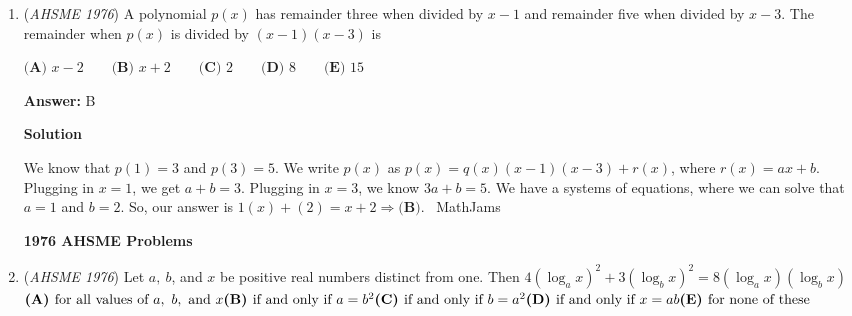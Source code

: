 \begin{enumerate}
 \textbf{Answer: }E



\textbf{Solution 1}

Extend $\overline{BD}$ until it touches the opposite side of the circle, say at point $E.$ By power of a point, we have $AB^2=(BC)(BE),$ so $BE=\frac{6^2}{3}=12.$ Therefore, $DE=12-3-3=6.$ 

 Now extend $\overline{OD}$ in both directions so that it intersects the circle in two points (in other words, draw the diameter of the circle that contains $OD$). Let the two endpoints of this diameter be $P$ and $Q,$ where $Q$ is closer to $C.$ Again use power of a point. We have $(PD)(DQ)=(CD)(DE)=3 \cdot 6=18.$ But if the radius of the circle is $r,$ we see that $PD=r+2$ and $DQ=r-2,$ so we have the equation $(r+2)(r-2)=18.$ Solving gives $r=\sqrt{22}.$

 ==Solution 2== (Law of Cosines Bash)

 Note we can make multiple triangles, and just eliminate the angle for an LOC Bash.

 


	\item (\textit{AHSME 1976}) A polynomial $p(x)$ has remainder three when divided by $x-1$ and remainder five when divided by $x-3$. 
The remainder when $p(x)$ is divided by $(x-1)(x-3)$ is


 $\textbf{(A) }x-2\qquad \textbf{(B) }x+2\qquad \textbf{(C) }2\qquad \textbf{(D) }8\qquad  \textbf{(E) }15$

 \textbf{Answer: }B



\textbf{Solution}

We know that $p(1)=3$ and $p(3)=5$. We write $p(x)$ as $p(x)=q(x)(x-1)(x-3)+r(x)$, where $r(x)=ax+b$. Plugging in $x=1$, we get $a+b=3$. Plugging in $x=3$, we know $3a+b=5$. We have a systems of equations, where we can solve that $a=1$ and $b=2$. So, our answer is $1(x)+(2)=x+2\Rightarrow \textbf{(B)}$. ~MathJams

 \textbf{1976 AHSME Problems} 


	\item (\textit{AHSME 1976}) Let $a,~b$, and $x$ be positive real numbers distinct from one. Then $4(\log_ax)^2+3(\log_bx)^2=8(\log_ax)(\log_bx)$
$\textbf{(A) }\text{for all values of }a,~b,\text{ and }x\qquad\\ \textbf{(B) }\text{if and only if }a=b^2\qquad\\ \textbf{(C) }\text{if and only if }b=a^2\qquad\\ \textbf{(D) }\text{if and only if }x=ab\qquad\\ \textbf{(E) }\text{for none of these}$


\end{enumerate}
